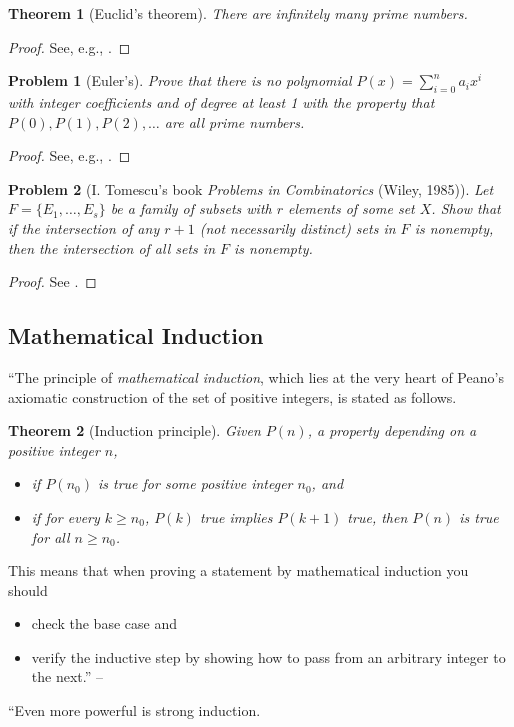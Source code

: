 \documentclass[oneside]{book}
\numberwithin{equation}{section}
\newtheorem{problem}{Problem}[section]
\newtheorem{theorem}{Theorem}[section]
\begin{document}
\begin{theorem}[Euclid's theorem]
	There are infinitely many prime numbers.
\end{theorem}

\begin{proof}[Proof]
	See, e.g., \cite[pp. 1--2]{Gelca_Andreescu2017}.
\end{proof}
 
\begin{problem}[Euler's]
	Prove that there is no polynomial $P(x) = \sum_{i=0}^n a_ix^i$ with integer coefficients and of degree at least 1 with the property that $P(0),P(1),P(2),\ldots$ are all prime numbers.
\end{problem}

\begin{proof}[Proof]
	See, e.g., \cite[p. 2]{Gelca_Andreescu2017}.
\end{proof}

\begin{problem}[I. Tomescu's book \textit{Problems in Combinatorics} (Wiley, 1985)]
	Let $F = \{E_1,\ldots,E_s\}$ be a family of subsets with $r$ elements of some set $X$. Show that if the intersection of any $r + 1$ (not necessarily distinct) sets in $F$ is nonempty, then the intersection of all sets in $F$ is nonempty.
\end{problem}

\begin{proof}[Proof]
	See \cite[p. 2]{Gelca_Andreescu2017}.
\end{proof}

\subsection{Mathematical Induction}
``The principle of \textit{mathematical induction}, which lies at the very heart of Peano's axiomatic construction of the set of positive integers, is stated as follows.

\begin{theorem}[Induction principle]
	Given $P(n)$, a property depending on a positive integer $n$,
	\begin{itemize}
		\item[(i)] if $P(n_0)$ is true for some positive integer $n_0$, and
		\item[(ii)] if for every $k\ge n_0$, $P(k)$ true implies $P(k + 1)$ true, then $P(n)$ is true for all $n\ge n_0$.
	\end{itemize}
\end{theorem}
This means that when proving a statement by mathematical induction you should
\begin{itemize}
	\item[(i)] check the base case and
	\item[(ii)] verify the inductive step by showing how to pass from an arbitrary integer to the next.'' -- \cite[Sect. 1.2, pp. 3--4]{Gelca_Andreescu2017}
\end{itemize}
``Even more powerful is strong induction.
\end{document}
